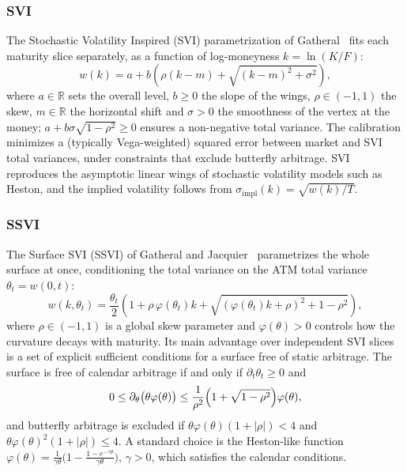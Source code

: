 \documentclass[11pt,a4paper]{article}
\theoremstyle{plain}
\theoremstyle{definition}
\newcommand{\R}{\mathbb{R}}
\begin{document}
\subsubsection{SVI}
The Stochastic Volatility Inspired (SVI) parametrization of Gatheral~\cite{gatheral} fits each maturity slice separately, as a function of log-moneyness $k=\ln(K/F)$:
\begin{equation}
    w(k) = a + b \left( \rho (k - m) + \sqrt{(k - m)^2 + \sigma^2} \right),
\end{equation}
where $a\in\R$ sets the overall level, $b \ge 0$ the slope of the wings, $\rho \in (-1, 1)$ the skew, $m \in \R$ the horizontal shift and $\sigma > 0$ the smoothness of the vertex at the money; $a+b\sigma\sqrt{1-\rho^2}\ge0$ ensures a non-negative total variance. The calibration minimizes a (typically Vega-weighted) squared error between market and SVI total variances, under constraints that exclude butterfly arbitrage. SVI reproduces the asymptotic linear wings of stochastic volatility models such as Heston, and the implied volatility follows from $\sigma_{\mathrm{impl}}(k)=\sqrt{w(k)/T}$.

















\subsubsection{SSVI}
The Surface SVI (SSVI) of Gatheral and Jacquier~\cite{gatheraljacquier} parametrizes the whole surface at once, conditioning the total variance on the ATM total variance $\theta_t=w(0,t)$:
\begin{equation}
    w(k, \theta_t) = \frac{\theta_t}{2} \left( 1 + \rho\, \varphi(\theta_t) k + \sqrt{(\varphi(\theta_t) k + \rho)^2 + 1 - \rho^2} \right),
\end{equation}
where $\rho \in (-1, 1)$ is a global skew parameter and $\varphi(\theta)>0$ controls how the curvature decays with maturity. Its main advantage over independent SVI slices is a set of explicit sufficient conditions for a surface free of static arbitrage. The surface is free of calendar arbitrage if and only if $\partial_t\theta_t\ge0$ and
\begin{equation}
    0\le\partial_\theta\bigl(\theta\varphi(\theta)\bigr)\le\frac1{\rho^2}\Bigl(1+\sqrt{1-\rho^2}\Bigr)\varphi(\theta),
\end{equation}
and butterfly arbitrage is excluded if $\theta\varphi(\theta)(1+|\rho|)<4$ and $\theta\varphi(\theta)^2(1+|\rho|)\le4$. A standard choice is the Heston-like function $\varphi(\theta)=\frac{1}{\gamma\theta}\bigl(1-\frac{1-e^{-\gamma\theta}}{\gamma\theta}\bigr)$, $\gamma>0$, which satisfies the calendar conditions.
\end{document}
